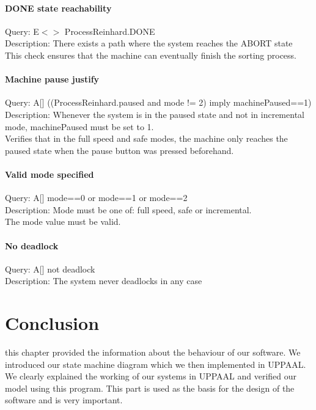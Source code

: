 \documentclass[a4paper,oneside,11pt]{article}
\begin{document}
\paragraph{DONE state reachability}
Query: E$<>$ ProcessReinhard.DONE \\
Description: There exists a path where the system reaches the ABORT state \\
This check ensures that the machine can eventually finish the sorting process.

\paragraph{Machine pause justify}
Query: A[] ((ProcessReinhard.paused and mode != 2) imply machinePaused==1) \\
Description: Whenever the system is in the paused state and not in incremental mode, machinePaused must be set to 1. \\
Verifies that in the full speed and safe modes, the machine only reaches the paused state when the pause button was pressed beforehand.

\paragraph{Valid mode specified}
Query: A[] mode==0 or mode==1 or mode==2 \\
Description: Mode must be one of: full speed, safe or incremental. \\
The mode value must be valid.

\paragraph{No deadlock}
Query: A[] not deadlock \\
Description: The system never deadlocks in any case \\

\section{Conclusion}
this chapter provided the information about the behaviour of our software. We introduced our state machine diagram which we then implemented in UPPAAL. We clearly explained the working of our systems in UPPAAL and verified our model using this program. This part is used as the basis for the design of the software and is very important.
\end{document}
